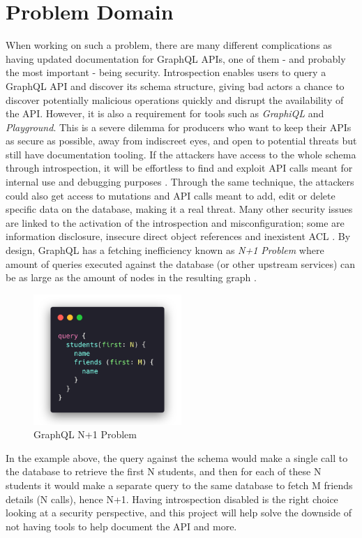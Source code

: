 \section*{Problem Domain}
\label{s:Problem-Domain}
When working on such a problem, there are many different complications as having
updated documentation for GraphQL APIs, one of them - and probably the most
important - being security. Introspection enables users to query a GraphQL API
and discover its schema structure, giving bad actors a chance to discover
potentially malicious operations \citep{khalilWhyYouShould2021} quickly and
disrupt the availability of the API. However, it is also a requirement for tools
such as \textit{GraphiQL} and \textit{Playground}. This is a severe dilemma for
producers who want to keep their APIs as secure as possible, away from
indiscreet eyes, and open to potential threats but still have documentation
tooling. If the attackers have access to the whole schema through introspection,
it will be effortless to find and exploit API calls meant for internal use and
debugging purposes \citep{rizwanGraphQLCommonVulnerabilities2021}. Through the
same technique, the attackers could also get access to mutations and API calls
meant to add, edit or delete specific data on the database, making it a real
threat. Many other security issues are linked to the activation of the
introspection and misconfiguration; some are information disclosure, insecure
direct object references and inexistent ACL \citep{
yeswehackHowExploitGraphQL2021}.
By design, GraphQL has a fetching inefficiency known as \textit{N+1 Problem}
where amount of queries executed against the database (or other upstream
services) can be as large as the amount of nodes in the resulting graph \citep{
graphqlbypopSuppressingProblemGraphQL2020}.
\begin{figure}[H]
  \centering
  \includegraphics[width=0.5\textwidth]{figures/code/n+1}
  \caption{GraphQL N+1 Problem}
  \label{f:GraphQL-N1-Problem}
\end{figure}
In the example above, the query against the schema would make a single call to
the database to retrieve the first N students, and then for each of these N
students it would make a separate query to the same database to fetch M friends
details (N calls), hence N+1. Having introspection disabled is the right choice
looking at a security perspective, and this project will help solve the downside
of not having tools to help document the API and more.

